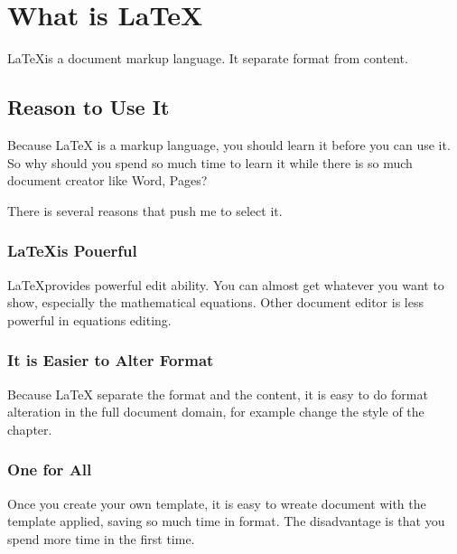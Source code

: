 \chapter{What is \LaTeX}

\LaTeX is a document markup language. It separate format from content.



\section{Reason to Use It}
Because \LaTeX \xspace{} is a markup language, you should learn it before you can use it.
So why should you spend so much time to learn it while there is so much document creator like Word, Pages?

There is several reasons that push me to select it.

\subsection{\LaTeX is Pouerful}
\label{sec:latex-pouerful}

\LaTeX provides powerful edit ability. You can almost get whatever you want to show, especially the mathematical equations. Other document editor is less powerful in equations editing.

\subsection{It is Easier to Alter Format}
\label{sec:it-easier-alter}

Because \LaTeX \xspace{} separate the format and the content, it is easy to do format alteration in the full document domain, for example change the style of the chapter.

\subsection{One for All}
\label{sec:one-all}

Once you create your own template, it is easy to wreate document with the template applied, saving so much time in format. The disadvantage is that you spend more time in the first time.


